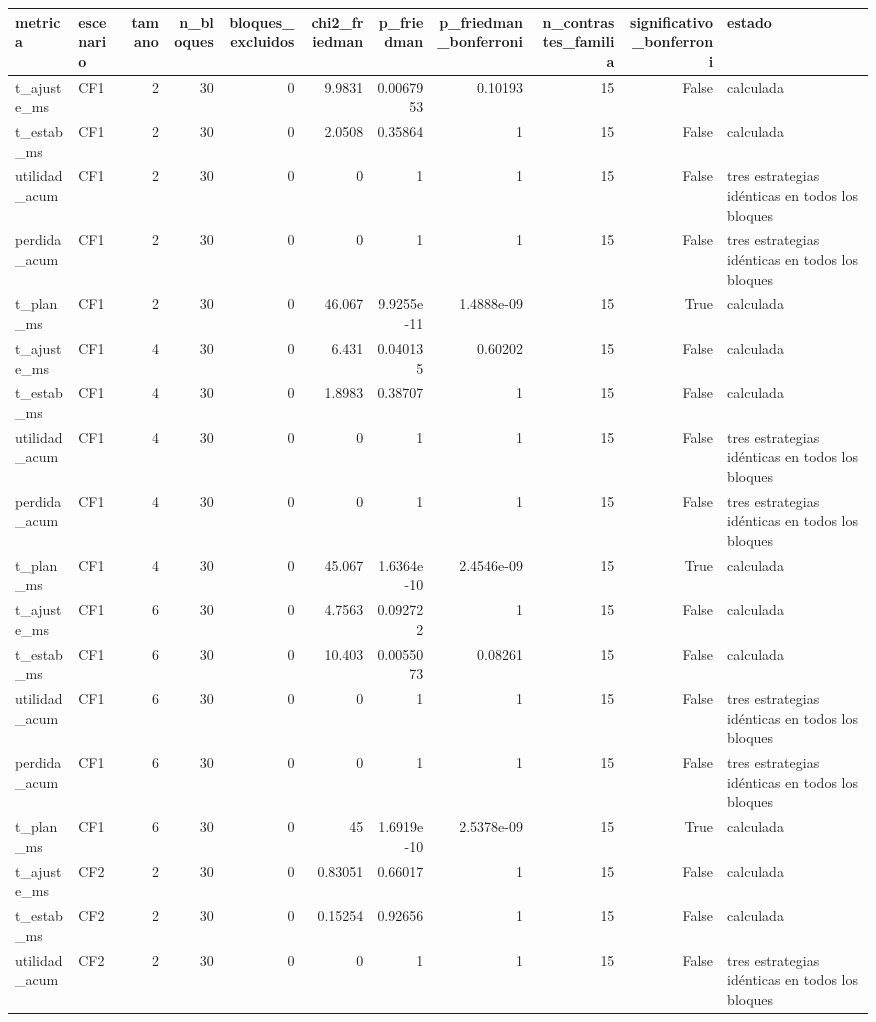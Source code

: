 \begin{tabular}{llrrrrrrrrl}
\toprule
metrica & escenario & tamano & n_bloques & bloques_excluidos & chi2_friedman & p_friedman & p_friedman_bonferroni & n_contrastes_familia & significativo_bonferroni & estado \\
\midrule
t_ajuste_ms & CF1 & 2 & 30 & 0 & 9.9831 & 0.0067953 & 0.10193 & 15 & False & calculada \\
t_estab_ms & CF1 & 2 & 30 & 0 & 2.0508 & 0.35864 & 1 & 15 & False & calculada \\
utilidad_acum & CF1 & 2 & 30 & 0 & 0 & 1 & 1 & 15 & False & tres estrategias idénticas en todos los bloques \\
perdida_acum & CF1 & 2 & 30 & 0 & 0 & 1 & 1 & 15 & False & tres estrategias idénticas en todos los bloques \\
t_plan_ms & CF1 & 2 & 30 & 0 & 46.067 & 9.9255e-11 & 1.4888e-09 & 15 & True & calculada \\
t_ajuste_ms & CF1 & 4 & 30 & 0 & 6.431 & 0.040135 & 0.60202 & 15 & False & calculada \\
t_estab_ms & CF1 & 4 & 30 & 0 & 1.8983 & 0.38707 & 1 & 15 & False & calculada \\
utilidad_acum & CF1 & 4 & 30 & 0 & 0 & 1 & 1 & 15 & False & tres estrategias idénticas en todos los bloques \\
perdida_acum & CF1 & 4 & 30 & 0 & 0 & 1 & 1 & 15 & False & tres estrategias idénticas en todos los bloques \\
t_plan_ms & CF1 & 4 & 30 & 0 & 45.067 & 1.6364e-10 & 2.4546e-09 & 15 & True & calculada \\
t_ajuste_ms & CF1 & 6 & 30 & 0 & 4.7563 & 0.092722 & 1 & 15 & False & calculada \\
t_estab_ms & CF1 & 6 & 30 & 0 & 10.403 & 0.0055073 & 0.08261 & 15 & False & calculada \\
utilidad_acum & CF1 & 6 & 30 & 0 & 0 & 1 & 1 & 15 & False & tres estrategias idénticas en todos los bloques \\
perdida_acum & CF1 & 6 & 30 & 0 & 0 & 1 & 1 & 15 & False & tres estrategias idénticas en todos los bloques \\
t_plan_ms & CF1 & 6 & 30 & 0 & 45 & 1.6919e-10 & 2.5378e-09 & 15 & True & calculada \\
t_ajuste_ms & CF2 & 2 & 30 & 0 & 0.83051 & 0.66017 & 1 & 15 & False & calculada \\
t_estab_ms & CF2 & 2 & 30 & 0 & 0.15254 & 0.92656 & 1 & 15 & False & calculada \\
utilidad_acum & CF2 & 2 & 30 & 0 & 0 & 1 & 1 & 15 & False & tres estrategias idénticas en todos los bloques \\

\end{tabular}
